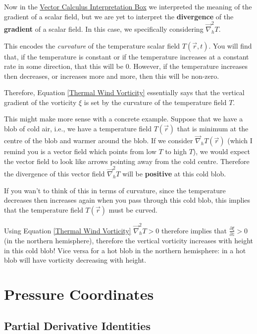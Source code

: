 Now in the \hyperref[VC Interp]{Vector Calculus Interpretation Box} we interpreted the meaning of the gradient of a scalar field, but we are yet to interpret the \textbf{divergence} of the \textbf{gradient} of a scalar field. In this case, we specifically considering $\vec{\nabla}_h^2 T$.

This encodes the \textit{curvature} of the temperature scalar field $T(\vec{r},t)$. You will find that, if the temperature is constant or if the temperature increases at a constant rate in some direction, that this will be $0$. However, if the temperature increases then decreases, or increases more and more, then this will be non-zero.

Therefore, Equation \ref{Thermal Wind Vorticity} essentially says that the vertical gradient of the vorticity $\xi$ is set by the curvature of the temperature field $T$. 

This might make more sense with a concrete example. Suppose that we have a blob of cold air, i.e., we have a temperature field $T(\vec{r})$ that is minimum at the centre of the blob and warmer around the blob. If we consider $\vec{\nabla}_h T(\vec{r})$ (which I remind you is a vector field which points from low $T$ to high $T$), we would expect the vector field to look like arrows pointing away from the cold centre. Therefore the divergence of this vector field $\vec{\nabla}_h^2 T$ will be \textbf{positive} at this cold blob.

If you wan't to think of this in terms of curvature, since the temperature decreases then increases again when you pass through this cold blob, this implies that the temperature field $T(\vec{r})$ must be curved.  

Using Equation \ref{Thermal Wind Vorticity} $\vec{\nabla}_h^2 T>0$ therefore implies that $\frac{\partial \xi}{\partial z}>0$ (in the northern hemisphere), therefore the vertical vorticity increases with height in this cold blob! Vice versa for a hot blob in the northern hemisphere: in a hot blob will have vorticity decreasing with height. 

\section{Pressure Coordinates}\label{Pressure Coords}
\subsection{Partial Derivative Identities}

